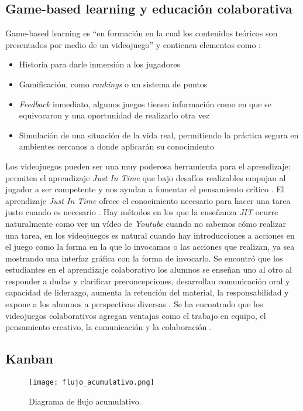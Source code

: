 \subsection{Game-based learning y educación colaborativa}
Game-based learning es “en formación en la cual los contenidos teóricos son presentados por medio de un videojuego” \cite{gamelearn2014a} y contienen elementos como \cite{gamelearn2017a}:
\begin{itemize}
    \item Historia para darle inmersión a los jugadores
    \item Gamificación, como \textit{rankings} o un sistema de puntos
    \item \textit{Feedback} inmediato, algunos juegos tienen información como en que se equivocaron y una oportunidad de realizarlo otra vez
    \item Simulación de una situación de la vida real, permitiendo la práctica segura en ambientes cercanos a donde aplicarán su conocimiento
\end{itemize}

Los videojuegos pueden ser una muy poderosa herramienta para el aprendizaje: permiten el aprendizaje \textit{Just In Time} que bajo desafíos realizables empujan al 
jugador a ser competente y nos ayudan a fomentar el pensamiento crítico \cite{levasseur-a}. 
El aprendizaje \textit{Just In Time} ofrece el conocimiento necesario para hacer una tarea justo cuando es necesario \cite{unknown2017a}. 
Hay métodos en los que la enseñanza \textit{JIT} ocurre naturalmente como ver un vídeo de \textit{Youtube} cuando no sabemos cómo realizar una tarea, 
en los videojuegos es natural cuando hay introducciones a acciones en el juego como la forma en la que lo invocamos o las acciones que realizan, 
ya sea mostrando una interfaz gráfica con la forma de invocarlo.
Se encontró que los estudiantes en el aprendizaje colaborativo los alumnos se enseñan uno al otro al responder a dudas y 
clarificar preconcepciones, desarrollan comunicación oral y capacidad de liderazgo, aumenta la retención del material, 
la responsabilidad y expone a los alumnos a perspectivas diversas \cite{university-a}.
Se ha encontrado que los videojuegos colaborativos agregan ventajas como el trabajo en equipo, el pensamiento creativo, 
la comunicación y la colaboración \cite{romano-a}.

\subsection{Kanban}
\begin{figure}[h!]
    \centering
    \texttt{[image: flujo\_acumulativo.png]}
        \caption{Diagrama de flujo acumulativo.}
    \label{fig:flujo_acumulativo}
\end{figure}

